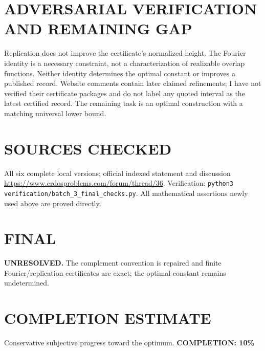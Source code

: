 \section{ADVERSARIAL VERIFICATION AND REMAINING GAP}
Replication does not improve the certificate's normalized height. The Fourier identity is a necessary constraint, not a characterization of realizable overlap functions. Neither identity determines the optimal constant or improves a published record. Website comments contain later claimed refinements; I have not verified their certificate packages and do not label any quoted interval as the latest certified record. The remaining task is an optimal construction with a matching universal lower bound.
\section{SOURCES CHECKED}
All six complete local versions; official indexed statement and discussion \url{https://www.erdosproblems.com/forum/thread/36}. Verification: \texttt{python3 verification/batch\_3\_final\_checks.py}. All mathematical assertions newly used above are proved directly.
\section{FINAL}
\textbf{UNRESOLVED.} The complement convention is repaired and finite Fourier/replication certificates are exact; the optimal constant remains undetermined.
\section{COMPLETION ESTIMATE}
Conservative subjective progress toward the optimum.
\textbf{COMPLETION: 10\%}
